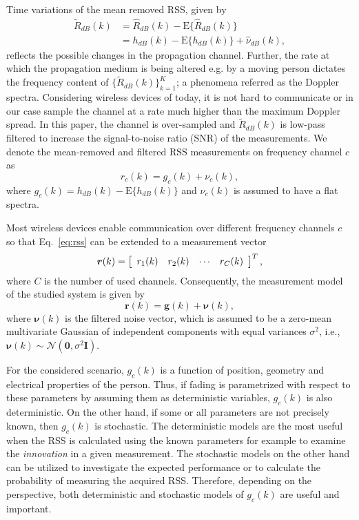 \documentclass[journal, 10pt, twocolumn, balance]{IEEEtran}
\begin{document}
Time variations of the mean removed RSS, given by
\begin{equation}\label{eq:rss_mean_removed_filtered}
\begin{aligned}
\tilde{R}_{dB}(k) &= \hat{R}_{dB}(k) - \mathrm{E}\{\hat{R}_{dB}(k)\} \\ 
	&= h_{dB}(k) - \mathrm{E}\{h_{dB}(k)\} + \hat{\nu}_{dB}(k),
\end{aligned}
\end{equation}
reflects the possible changes in the propagation channel. Further, the rate at which the propagation medium is being altered e.g. by a moving person dictates the frequency content of $\{\tilde{R}_{dB}(k)\}_{k=1}^K$; a phenomena referred as the Doppler spectra. Considering wireless devices of today, it is not hard to communicate or in our case sample the channel at a rate much higher than the maximum Doppler spread. In this paper, the channel is over-sampled and $\tilde{R}_{dB}(k)$ is low-pass filtered to increase the signal-to-noise ratio (SNR) of the measurements. We denote the mean-removed and filtered RSS measurements on frequency channel $c$ as
\begin{equation} \label{eq:rss}
    r_c(k) =  g_c(k) + \nu_c(k),
\end{equation}
where $g_c(k) = h_{dB}(k) - \mathrm{E}\{h_{dB}(k)\}$ and $\nu_c(k) $ is assumed to have a flat spectra.


Most wireless devices enable communication over different frequency channels $c$ so that Eq.~\eqref{eq:rss} can be extended to a measurement vector 
\begin{equation}
	\bm{r}(k) = \left[ \begin{array}{l l c l} r_1(k)&r_2(k)&\cdots&r_C(k) \end{array} \right]^T,
\end{equation}
where $C$ is the number of used channels. Consequently, the measurement model of the studied system is given by
\begin{equation}  \label{eq:measurementmodel}
	\boldsymbol{r}(k) = \boldsymbol{g}(k) + \boldsymbol{\nu}(k), 
\end{equation}
where $\bm{\nu}(k)$ is the filtered noise vector, which is assumed to be a zero-mean multivariate Gaussian of independent components with equal variances $\sigma^2$, i.e., $ \bm{\nu}(k) \sim \mathcal{N}(\bm{0}, \sigma^2 \bm{I})$.


For the considered scenario, $g_c(k)$ is a function of position, geometry and electrical properties of the person. Thus, if fading is parametrized with respect to these parameters by assuming them as deterministic variables, $g_c(k)$ is also deterministic. On the other hand, if some or all parameters are not precisely known, then $g_c(k)$ is stochastic. The deterministic models are the most useful when the RSS is calculated using the known parameters for example to examine the \emph{innovation} in a given measurement. The stochastic models on the other hand can be utilized to investigate the expected performance or to calculate the probability of measuring the acquired RSS. Therefore, depending on the perspective, both deterministic and stochastic models of $g_c(k)$ are useful and important.
\end{document}
